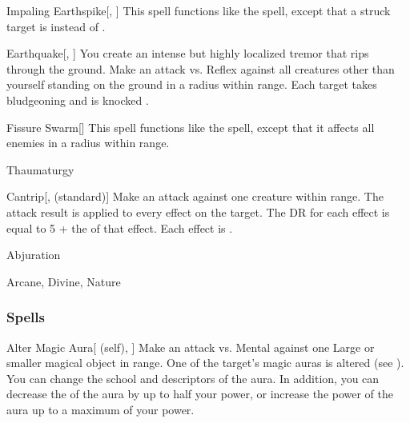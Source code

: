 \begin{ability}[\nth{4}]{Impaling Earthspike}[, ]
This spell functions like the  spell, except that a struck target is  instead of .
\end{ability}
\vspace{0.25em}



\begin{ability}[\nth{5}]{Earthquake}[, ]
You create an intense but highly localized tremor that rips through the ground.
Make an attack vs. Reflex against all creatures other than yourself standing on the ground in a \arealarge radius within \rngmed range.
\hit Each target takes bludgeoning  and is knocked .
\end{ability}
\vspace{0.25em}



\begin{ability}[\nth{6}]{Fissure Swarm}[]
This spell functions like the  spell, except that it affects all enemies in a \areamed radius within \rngmed range.
\end{ability}
\vspace{0.25em}


\newpage
\begin{spellsection}{Thaumaturgy}


\begin{ability}{Cantrip}[,  (standard)]
Make an attack against one creature within \rngmed range.
The attack result is applied to every  effect on the target.
The DR for each effect is equal to 5 + the  of that effect.
\hit Each effect is .
\end{ability}




 Abjuration

 Arcane, Divine, Nature
\end{spellsection}


\subsubsection{Spells}


\begin{ability}[\nth{1}]{Alter Magic Aura}[ (self), ]
Make an attack vs. Mental against one Large or smaller magical object in \rngmed range.
\hit One of the target's magic auras is altered (see ).
You can change the school and descriptors of the aura.
In addition, you can decrease the  of the aura by up to half your power, or increase the power of the aura up to a maximum of your power.
\end{ability}
\vspace{0.25em}



